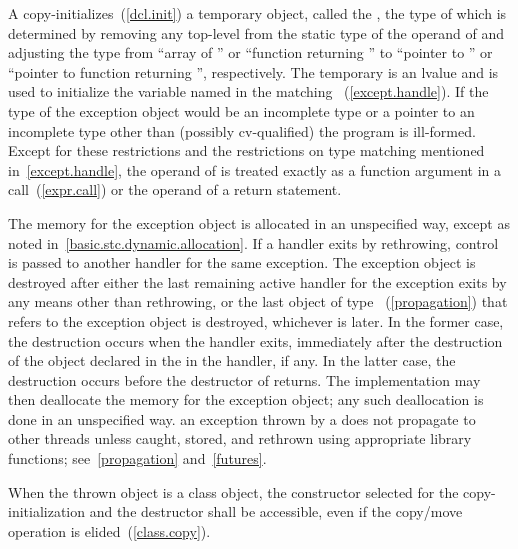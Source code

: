 \pnum
A
copy-initializes~(\ref{dcl.init}) a temporary object,
called the
,
the type of which
is determined by removing any top-level
from the static type of the operand of
and adjusting the type from ``array of
''
or ``function returning
''
to ``pointer to
''
or ``pointer to function
returning
'',
respectively.
The temporary is an lvalue and is used to initialize the
variable named in the matching
~(\ref{except.handle}).
If the type of the exception object would
be an incomplete type or a pointer to an incomplete
type other than (possibly cv-qualified)
 the program is ill-formed.
Except for these restrictions and the restrictions on type matching mentioned
in~\ref{except.handle}, the operand of
is treated exactly as a function argument in a call~(\ref{expr.call}) or the operand
of a return statement.

\pnum
{}%
%
%
The memory for the exception object is
allocated in an unspecified way, except as noted in~\ref{basic.stc.dynamic.allocation}.
If a handler exits by rethrowing, control is passed to another handler for
the same exception.
The exception object is destroyed after either
the last remaining active handler for the exception exits by
any means other than
rethrowing, or the last object of type ~(\ref{propagation})
that refers to the exception object is destroyed, whichever is later. In the former
case, the destruction occurs when the handler exits, immediately after the destruction
of the object declared in the  in the handler, if any.
In the latter case, the destruction occurs before the destructor of 
returns.
The implementation may then
deallocate the memory for the exception object; any such deallocation
is done in an unspecified way.
\enternote an exception thrown by a  does not
propagate to other threads unless caught, stored, and rethrown using
appropriate library functions; see~\ref{propagation} and~\ref{futures}. \exitnote

\pnum
{}%
%
When the thrown object is a class object, the constructor selected for
the copy-initialization and the
destructor shall be accessible, even if the copy/move operation is
elided~(\ref{class.copy}).

